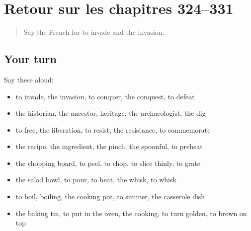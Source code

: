 \section[(dialogue)]{Retour sur les chapitres 324–331}

\label{lesson:FR-R331-revision-324-331}



\begin{quote}
Say the French for to invade and the invasion.
\end{quote}

\subsection*{Your turn}
Say these aloud:

\begin{itemize}
\raggedright
  \item to invade, the invasion, to conquer, the conquest, to defeat
  \item the historian, the ancestor, heritage, the archaeologist, the dig
  \item to free, the liberation, to resist, the resistance, to commemorate
  \item the recipe, the ingredient, the pinch, the spoonful, to preheat
  \item the chopping board, to peel, to chop, to slice thinly, to grate
  \item the salad bowl, to pour, to beat, the whisk, to whisk
  \item to boil, boiling, the cooking pot, to simmer, the casserole dish
  \item the baking tin, to put in the oven, the cooking, to turn golden, to brown on top
\end{itemize}

